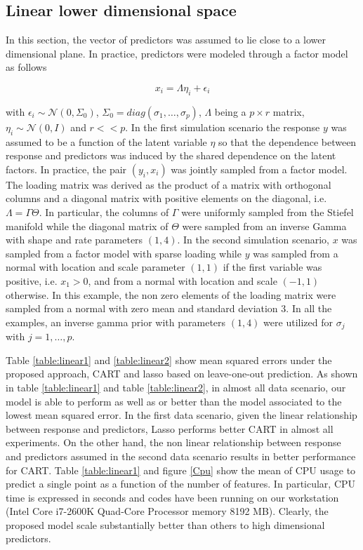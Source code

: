 \documentclass{article} %
\providecommand{\mc}[1]{\mathcal{#1}}
\begin{document}

\subsection{Linear lower dimensional space} \label{section:linear}

In this section, the vector of predictors was assumed to lie close to a lower dimensional plane. In practice,  predictors were modeled through a factor model as follows 

\begin{equation} x_i=\Lambda \eta_i + \epsilon_i \end{equation} 

with $\epsilon_i \sim \mc{N}(0,\Sigma_0)$, $\Sigma_0=diag(\sigma_1, \ldots, \sigma_p)$, $\Lambda$ being a $p \times r$ matrix, $\eta_i \sim \mc{N}(0,I)$ and $r<<p$. In the first simulation scenario the response $y$ was assumed to be a function of the latent variable $\eta$ so that  the dependence between response and predictors was induced by the shared dependence on the latent factors. In practice, the pair $(y_i, x_i)$ was jointly sampled from a factor model. The loading matrix was derived as the product of a matrix with orthogonal columns and a diagonal matrix with positive elements on the diagonal, i.e. $\Lambda=\Gamma \Theta$. In particular, the columns of $\Gamma$ were uniformly sampled from the Stiefel manifold while the diagonal matrix of $\Theta$ were sampled from an inverse Gamma with shape and rate parameters $(1,4)$. In the second simulation scenario, $x$ was sampled from a factor model with sparse loading while $y$ was sampled from a normal with location and scale parameter $(1,1)$ if the first variable was positive, i.e. $x_1>0$, and from a normal with location and scale $(-1,1)$ otherwise.  In this example, the non zero elements of the loading matrix were sampled from a normal with zero mean and standard deviation $3$. In all the examples, an inverse gamma prior with parameters $(1,4)$ were utilized for $\sigma_j$ with $j=1, \ldots, p$.

Table \ref{table:linear1} and \ref{table:linear2} show mean squared errors under the proposed approach, CART and lasso based on leave-one-out prediction. As shown in table \ref{table:linear1} and table \ref{table:linear2}, in almost all data scenario, our model is able to perform as well as or better than the model associated to the lowest mean squared error. In the first data scenario, given the linear relationship between response and predictors, Lasso performs better CART in almost all experiments. On the other hand, the non linear relationship between response and predictors assumed in the second data scenario results in better performance for CART. Table \ref{table:linear1} and figure \ref{Cpu} show the mean of CPU usage to predict a single point as a function of the number of features. In particular, CPU time is expressed in seconds and codes have been running on our workstation (Intel Core i7-2600K Quad-Core Processor memory 8192 MB).  Clearly, the proposed model scale substantially better than others to high dimensional predictors. 
\end{document}
